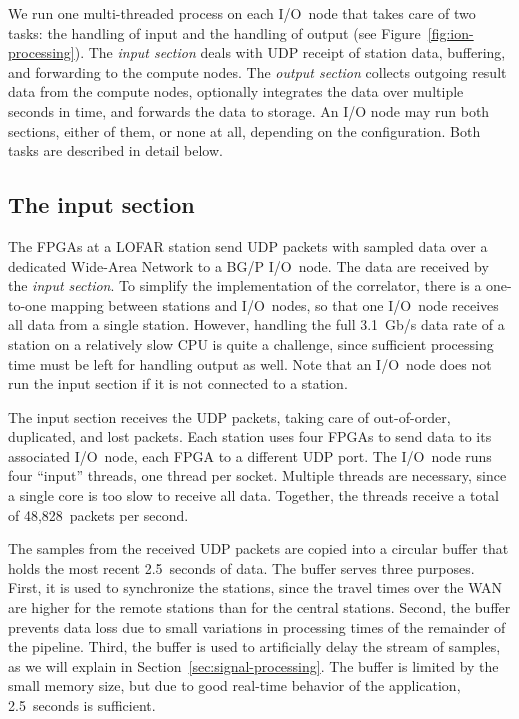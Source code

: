 \documentclass{sig-alternate}
\begin{document}
We run one multi-threaded process on each I/O~node that takes care of two
tasks: the handling of input and the handling of output (see
Figure~\ref{fig:ion-processing}).
The \emph{input section\/} deals with UDP receipt of station data, buffering,
and forwarding to the compute nodes.
The \emph{output section\/} collects outgoing result data from the compute
nodes, optionally integrates the data over multiple seconds in time, and
forwards the data to storage.
An I/O node may run both sections, either of them, or none at all, depending
on the configuration.
Both tasks are described in detail below.


\subsection{The input section}
\label{sec:input-handling}

The FPGAs at a LOFAR station send UDP packets with sampled data over a
dedicated Wide-Area Network to a BG/P I/O~node.
The data are received by the \emph{input section}.
To simplify the implementation of the correlator, there is a one-to-one
mapping between stations and I/O~nodes, so that one I/O~node receives all
data from a single station.
However, handling the full 3.1~Gb/s data rate of a station on a relatively
slow CPU is quite a challenge, since sufficient processing time must be left
for handling output as well.
Note that an I/O~node does not run the input section if it is not
connected to a station.

The input section receives the UDP packets, taking care of out-of-order,
duplicated, and lost packets.
Each station uses four FPGAs to send data to its associated I/O~node,
each FPGA to a different UDP port.
The I/O~node runs four ``input'' threads, one thread per socket.
Multiple threads are necessary, since a single core is too slow to receive all
data.
Together, the threads receive a total of 48,828~packets per second.

The samples from the received UDP packets are copied into a circular buffer that
holds the most recent 2.5~seconds of data.
The buffer serves three purposes.
First, it is used to synchronize the stations, since the travel times over
the WAN are higher for the remote stations than for the central stations.
Second, the buffer prevents data loss due to small variations in processing
times of the remainder of the pipeline.
Third, the buffer is used to artificially delay the stream of samples,
as we will explain in Section~\ref{sec:signal-processing}.
The buffer is limited by the small memory size, but due to good real-time
behavior of the application, 2.5~seconds is sufficient.
\end{document}
